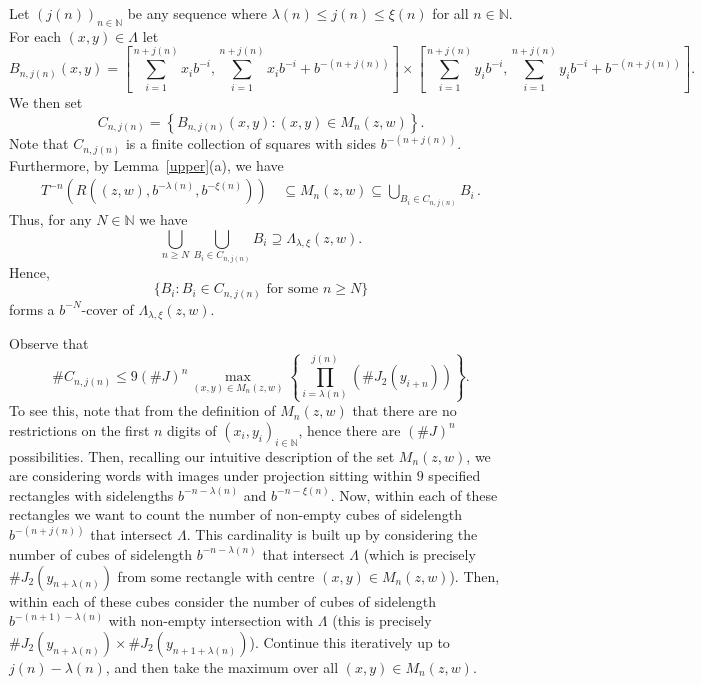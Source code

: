 \documentclass[12pt]{article}
\theoremstyle{remark}
\numberwithin{equation}{section}
\renewcommand{\Bbb}[1]{\mathbb{#1}}
\newcommand{\N}{{\Bbb N}}         %
\newcommand{\0}{\mathbf{0}}
\begin{document}
Let $(j(n))_{n\in\N}$ be any sequence where $\lambda(n) \leq j(n) \leq \xi(n)$ for all $n\in\N$. For each $(x,y)\in\Lambda$ let
\begin{equation*}
B_{n,j(n)}(x,y)=\left[\sum_{i=1}^{n+j(n)} x_ib^{-i},\sum_{i=1}^{n+j(n)} x_ib^{-i}+b^{-(n+j(n))}\right]\times\left[\sum_{i=1}^{n+j(n)} y_ib^{-i},\sum_{i=1}^{n+j(n)}y_ib^{-i}+b^{-(n+j(n))}\right].
\end{equation*}
We then set
\begin{equation*}
C_{n,j(n)}=\left\{B_{n,j(n)}(x,y): (x,y) \in M_{n}(z,w) \right\}.
\end{equation*}
Note  that $C_{n,j(n)}$ is a finite collection of squares with sides $b^{-(n+j(n))}$. Furthermore, by Lemma~\ref{upper}(a), we have
\begin{align*}
T^{-n}\left(R\left((z,w), b^{-\lambda(n)}, b^{-\xi(n)}\right)\right)\, &\subseteq M_n(z,w) \subseteq \bigcup_{B_{i} \in C_{n,j(n)}} B_{i}\, . 
\end{align*}
Thus, for any $N \in \N$  we have 
\begin{equation*}
     \bigcup_{n \geq N} \bigcup_{B_{i} \in C_{n,j(n)}}B_{i} \supseteq \Lambda_{\lambda,\xi}(z,w).
\end{equation*}
Hence, 
\begin{equation*}
\{B_i:B_i\in C_{n,j(n)}\text{ for some } n\geq N\}
\end{equation*}
forms a $b^{-N}$-cover of $\Lambda_{\lambda, \xi}(z,w)$. 

Observe that
 \begin{equation*}
     \#C_{n,j(n)} \leq 9(\#J)^{n} \max_{(x,y) \in M_{n}(z,w)} \left\{\prod_{i=\lambda(n)}^{j(n)}(\#J_{2}(y_{i+n})) \right\}.
\end{equation*}
 To see this, note that from the definition of $M_n(z,w)$ that there are no restrictions on the first $n$ digits of $(x_{i},y_{i})_{i \in \N}$, hence there are $(\#J)^{n}$ possibilities. Then, recalling our intuitive description of the set $M_n(z,w)$, we are considering words with images under projection sitting within $9$ specified rectangles with sidelengths $b^{-n-\lambda(n)}$ and $b^{-n-\xi(n)}$. Now, within each of these rectangles {we want to} count the number of non-empty cubes of sidelength $b^{-(n+j(n))}$ that intersect $\Lambda$. This cardinality is built up by considering the number of cubes of sidelength $b^{-n-\lambda{(n)}}$ that intersect $\Lambda$ (which is precisely $\#J_{2}(y_{n+\lambda{(n)}})$ from some rectangle with centre $(x,y)\in M_{n}(z,w)$). Then, within each of these cubes consider the number of cubes of sidelength $b^{-(n+1)-\lambda{(n)}}$ with non-empty intersection with $\Lambda$ (this is precisely $\#J_{2}(y_{n+\lambda{(n)}})\times \#J_{2}(y_{n+1+\lambda{(n)}})$). Continue this iteratively up to $j(n)-\lambda(n)$, and then take the maximum over all $(x,y)\in M_{n}(z,w)$.
\end{document}
